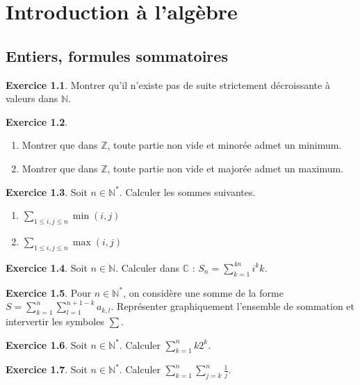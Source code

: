\documentclass[french]{book}
\newcommand{\N}{\mathbb{N}}
\newcommand{\Z}{\mathbb{Z}}
\newcommand{\C}{\mathbb{C}}
\newcommand{\st}{^*}
\theoremstyle{definition}
\newtheorem{ex}{Exercice}[chapter]
\theoremstyle{theorem}
\theoremstyle{remark}
\begin{document}
\chapter{Introduction à l'algèbre}

\section{Entiers, formules sommatoires}

\begin{ex}
	Montrer qu'il n'existe pas de suite strictement décroissante à valeurs dans $\N$.
\end{ex}

\begin{ex}
	\begin{enumerate}
		\item Montrer que dans $\Z$, toute partie non vide et minorée admet un minimum.
		\item Montrer que dans $\Z$, toute partie non vide et majorée admet un maximum.
	\end{enumerate}
\end{ex}

\begin{ex}
	Soit $n\in\N\st$. Calculer les sommes suivantes.
	\begin{enumerate}
		\item $\displaystyle\sum_{1\leqslant i,j\leqslant n}\min(i,j)$
		\item $\displaystyle\sum_{1\leqslant i,j\leqslant n}\max(i,j)$
	\end{enumerate}
\end{ex}

\begin{ex}
	Soit $n\in\N$. Calculer dans $\C$ : $S_n=\displaystyle\sum_{k=1}^{4n}i^k k$.
\end{ex}

\begin{ex}
	Pour $n\in\N\st$, on considère une somme de la forme $S=\displaystyle\sum_{k=1}^{n}\sum_{l=1}^{n+1-k}a_{k,l}$. Représenter graphiquement l'ensemble de sommation et intervertir les symboles $\sum$.
\end{ex}

\begin{ex}
	Soit $n\in\N\st$. Calculer $\displaystyle\sum_{k=1}^{n}k2^k$.
\end{ex}

\begin{ex}
	Soit $n\in\N\st$. Calculer $\displaystyle\sum_{k=1}^{n}\sum_{j=k}^{n}\frac{1}{j}$.
\end{ex}
\end{document}
